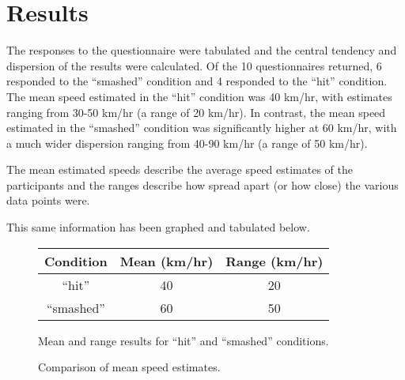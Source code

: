 \documentclass[a4paper,11pt]{report}
\begin{document}
\section{Results}

The responses to the questionnaire were tabulated and the central tendency
and dispersion of the results were calculated. Of the 10 questionnaires
returned, 6 responded to the “smashed” condition and 4 responded to the
“hit” condition. The mean speed estimated in the “hit” condition was 40
km/hr, with estimates ranging from 30-50 km/hr (a range of 20 km/hr).
In contrast, the mean speed estimated in the “smashed” condition was
significantly higher at 60 km/hr, with a much wider dispersion ranging from
40-90 km/hr (a range of 50 km/hr).

The mean estimated speeds describe the average speed estimates of the
participants and the ranges describe how spread apart (or how close)
the various data points were.

This same information has been graphed and tabulated below.

\begin{figure}[h]
\begin{center}
\begin{tabular}{ccc}
\toprule
Condition & Mean (km/hr) & Range (km/hr)\\
\midrule
“hit” & 40 & 20\\
“smashed” & 60 & 50\\
\bottomrule
\end{tabular}
\end{center}
\caption{Mean and range results for “hit” and “smashed” conditions.}
\end{figure}

\begin{figure}[h]
\begin{center}
\end{center}
\caption{Comparison of mean speed estimates.}
\end{figure}
\end{document}
